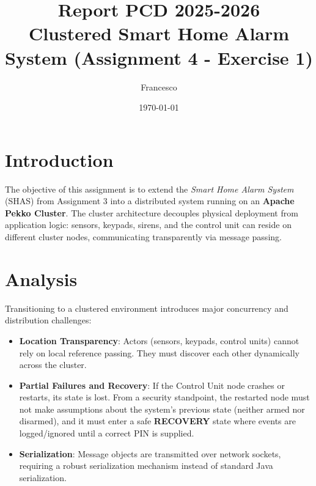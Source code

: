 \documentclass[11pt,a4paper]{article}
\title{Report PCD 2025-2026 \\ Clustered Smart Home Alarm System (Assignment 4 - Exercise 1)}
\author{Francesco}
\date{\today}
\begin{document}
\maketitle

\section{Introduction}
The objective of this assignment is to extend the \textit{Smart Home Alarm System} (SHAS) from Assignment 3 into a distributed system running on an \textbf{Apache Pekko Cluster}. The cluster architecture decouples physical deployment from application logic: sensors, keypads, sirens, and the control unit can reside on different cluster nodes, communicating transparently via message passing.

\section{Analysis}
Transitioning to a clustered environment introduces major concurrency and distribution challenges:
\begin{itemize}
    \item \textbf{Location Transparency}: Actors (sensors, keypads, control units) cannot rely on local reference passing. They must discover each other dynamically across the cluster.
    \item \textbf{Partial Failures and Recovery}: If the Control Unit node crashes or restarts, its state is lost. From a security standpoint, the restarted node must not make assumptions about the system's previous state (neither armed nor disarmed), and it must enter a safe \textbf{RECOVERY} state where events are logged/ignored until a correct PIN is supplied.
    \item \textbf{Serialization}: Message objects are transmitted over network sockets, requiring a robust serialization mechanism instead of standard Java serialization.
\end{itemize}
\end{document}
